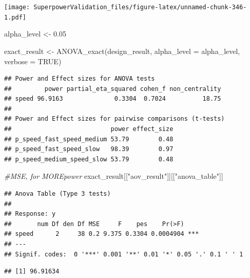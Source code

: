 \documentclass[
]{book}
\newenvironment{Shaded}{\begin{snugshade}}{\end{snugshade}}
\newcommand{\AttributeTok}[1]{\textcolor[rgb]{0.77,0.63,0.00}{#1}}
\newcommand{\CommentTok}[1]{\textcolor[rgb]{0.56,0.35,0.01}{\textit{#1}}}
\newcommand{\ConstantTok}[1]{\textcolor[rgb]{0.00,0.00,0.00}{#1}}
\newcommand{\FloatTok}[1]{\textcolor[rgb]{0.00,0.00,0.81}{#1}}
\newcommand{\FunctionTok}[1]{\textcolor[rgb]{0.00,0.00,0.00}{#1}}
\newcommand{\NormalTok}[1]{#1}
\newcommand{\OtherTok}[1]{\textcolor[rgb]{0.56,0.35,0.01}{#1}}
\newcommand{\SpecialCharTok}[1]{\textcolor[rgb]{0.00,0.00,0.00}{#1}}
\newcommand{\StringTok}[1]{\textcolor[rgb]{0.31,0.60,0.02}{#1}}
\begin{document}
\texttt{[image: SuperpowerValidation\_files/figure-latex/unnamed-chunk-346-1.pdf]}

\begin{Shaded}
\begin{Highlighting}[]
\NormalTok{alpha\_level }\OtherTok{\textless{}{-}} \FloatTok{0.05}

\NormalTok{exact\_result }\OtherTok{\textless{}{-}} \FunctionTok{ANOVA\_exact}\NormalTok{(design\_result,}
                            \AttributeTok{alpha\_level =}\NormalTok{ alpha\_level,}
                            \AttributeTok{verbose =} \ConstantTok{TRUE}\NormalTok{)}
\end{Highlighting}
\end{Shaded}

\begin{verbatim}
## Power and Effect sizes for ANOVA tests
##         power partial_eta_squared cohen_f non_centrality
## speed 96.9163              0.3304  0.7024          18.75
## 
## Power and Effect sizes for pairwise comparisons (t-tests)
##                           power effect_size
## p_speed_fast_speed_medium 53.79        0.48
## p_speed_fast_speed_slow   98.39        0.97
## p_speed_medium_speed_slow 53.79        0.48
\end{verbatim}

\begin{Shaded}
\begin{Highlighting}[]
\CommentTok{\#MSE, for MOREpower}
\NormalTok{exact\_result[[}\StringTok{"aov\_result"}\NormalTok{]][[}\StringTok{"anova\_table"}\NormalTok{]]}
\end{Highlighting}
\end{Shaded}

\begin{verbatim}
## Anova Table (Type 3 tests)
## 
## Response: y
##       num Df den Df MSE     F    pes    Pr(>F)    
## speed      2     38 0.2 9.375 0.3304 0.0004904 ***
## ---
## Signif. codes:  0 '***' 0.001 '**' 0.01 '*' 0.05 '.' 0.1 ' ' 1
\end{verbatim}

\begin{Shaded}
\end{Shaded}

\begin{verbatim}
## [1] 96.91634
\end{verbatim}
\end{document}
